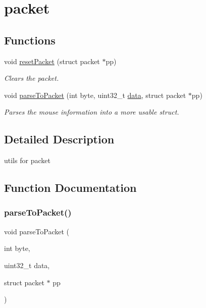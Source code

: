\hypertarget{group__packet}{}\section{packet}
\label{group__packet}
\subsection*{Functions}
\begin{DoxyCompactItemize}
\item 
void \mbox{\hyperlink{group__packet_gaba77b8d667ad6e8f70d3437e0f970d9f}{reset\+Packet}} (struct packet $\ast$pp)
\begin{DoxyCompactList}\small\item\em Clears the packet. \end{DoxyCompactList}\item 
void \mbox{\hyperlink{group__packet_gab8c9528083362ee2239ec6a11e9e5b94}{parse\+To\+Packet}} (int byte, uint32\+\_\+t \mbox{\hyperlink{font_8c_a5d286c9bcb0e4c4f62d09f5ec39118e4}{data}}, struct packet $\ast$pp)
\begin{DoxyCompactList}\small\item\em Parses the mouse information into a more usable struct. \end{DoxyCompactList}\end{DoxyCompactItemize}


\subsection{Detailed Description}
utils for packet 

\subsection{Function Documentation}
\mbox{\label{group__packet_gab8c9528083362ee2239ec6a11e9e5b94}} 
\subsubsection{\texorpdfstring{parseToPacket()}{parseToPacket()}}
{\footnotesize\ttfamily void parse\+To\+Packet (\begin{DoxyParamCaption}\item[{int}]{byte,  }\item[{uint32\+\_\+t}]{data,  }\item[{struct packet $\ast$}]{pp }\end{DoxyParamCaption})}



